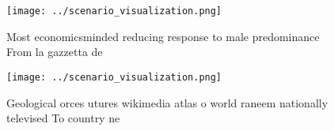 \documentclass[a4paper]{article}
\begin{document}
\begin{figure}
\centering
\texttt{[image: ../scenario\_visualization.png]}
\caption{Most economicsminded reducing response to male predominance From la gazzetta de
}
\end{figure}
 
\begin{figure}
\centering
\texttt{[image: ../scenario\_visualization.png]}
\caption{Geological orces utures wikimedia atlas o world raneem nationally televised To country ne
}
\end{figure}
 
\end{document}
